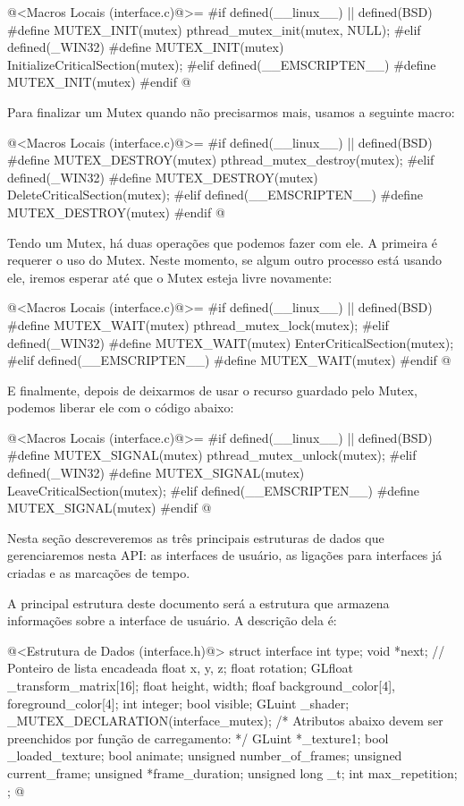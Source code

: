 \iniciocodigo
@<Macros Locais (interface.c)@>=
#if defined(__linux__) || defined(BSD)
#define MUTEX_INIT(mutex) pthread_mutex_init(mutex, NULL);
#elif defined(_WIN32)
#define MUTEX_INIT(mutex) InitializeCriticalSection(mutex);
#elif defined(__EMSCRIPTEN__)
#define MUTEX_INIT(mutex)
#endif
@
\fimcodigo

Para finalizar um Mutex quando não precisarmos mais, usamos a seguinte
macro:

\iniciocodigo
@<Macros Locais (interface.c)@>=
#if defined(__linux__) || defined(BSD)
#define MUTEX_DESTROY(mutex) pthread_mutex_destroy(mutex);
#elif defined(_WIN32)
#define MUTEX_DESTROY(mutex) DeleteCriticalSection(mutex);
#elif defined(__EMSCRIPTEN__)
#define MUTEX_DESTROY(mutex)
#endif
@
\fimcodigo

Tendo um Mutex, há duas operações que podemos fazer com ele. A
primeira é requerer o uso do Mutex. Neste momento, se algum outro
processo está usando ele, iremos esperar até que o Mutex esteja livre
novamente:

\iniciocodigo
@<Macros Locais (interface.c)@>=
#if defined(__linux__) || defined(BSD)
#define MUTEX_WAIT(mutex) pthread_mutex_lock(mutex);
#elif defined(_WIN32)
#define MUTEX_WAIT(mutex) EnterCriticalSection(mutex);
#elif defined(__EMSCRIPTEN__)
#define MUTEX_WAIT(mutex)
#endif
@
\fimcodigo

E finalmente, depois de deixarmos de usar o recurso guardado pelo
Mutex, podemos liberar ele com o código abaixo:

\iniciocodigo
@<Macros Locais (interface.c)@>=
#if defined(__linux__) || defined(BSD)
#define MUTEX_SIGNAL(mutex) pthread_mutex_unlock(mutex);
#elif defined(_WIN32)
#define MUTEX_SIGNAL(mutex) LeaveCriticalSection(mutex);
#elif defined(__EMSCRIPTEN__)
#define MUTEX_SIGNAL(mutex)
#endif
@
\fimcodigo


Nesta seção descreveremos as três principais estruturas de dados que
gerenciaremos nesta API: as interfaces de usuário, as ligações para
interfaces já criadas e as marcações de tempo.


A principal estrutura deste documento será a estrutura que armazena
informações sobre a interface de usuário. A descrição dela é:

\iniciocodigo
@<Estrutura de Dados (interface.h)@>
struct interface {
  int type;
  void *next; // Ponteiro de lista encadeada
  float x, y, z;
  float rotation;
  GLfloat _transform_matrix[16];
  float height, width;
  floaf background_color[4], foreground_color[4];
  int integer;
  bool visible;
  GLuint _shader;
  _MUTEX_DECLARATION(interface_mutex);
  /* Atributos abaixo devem ser preenchidos por função de carregamento: */
  GLuint *_texture1;
  bool _loaded_texture;
  bool animate;
  unsigned number_of_frames;
  unsigned current_frame;
  unsigned *frame_duration;
  unsigned long _t;
  int max_repetition;
};
\fimcodigo
@

